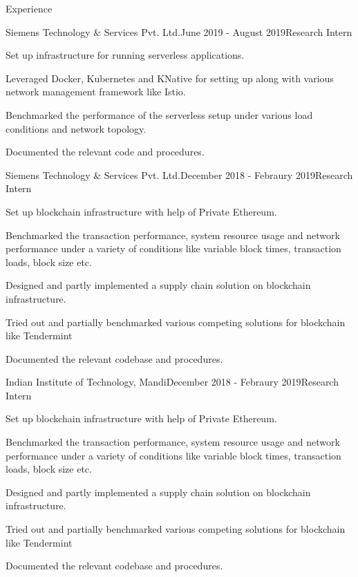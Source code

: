 \documentclass{resume} %
\begin{document}
\begin{rSection}{Experience}

\begin{rSubsection}{Siemens Technology \& Services Pvt. Ltd.}{June 2019 - August 2019}{Research Intern}{}
\item Set up infrastructure for running serverless applications.
\item Leveraged Docker, Kubernetes and KNative for setting up along with various network management framework like Istio.
\item Benchmarked the performance of the serverless setup under various load conditions and network topology.
\item Documented the relevant code and procedures. 
\end{rSubsection}


\begin{rSubsection}{Siemens Technology \& Services Pvt. Ltd.}{December 2018 - Febraury 2019}{Research Intern}{}
\item Set up blockchain infrastructure with help of Private Ethereum.
\item Benchmarked the transaction performance, system resource usage and network performance under a variety of conditions like variable block times, transaction loads, block size etc.
\item Designed and partly implemented a supply chain solution on blockchain infrastructure.
\item Tried out and partially benchmarked various competing solutions for blockchain like Tendermint
\item Documented the relevant codebase and procedures.
\end{rSubsection}


\begin{rSubsection}{Indian Institute of Technology, Mandi}{December 2018 - Febraury 2019}{Research Intern}{}
\item Set up blockchain infrastructure with help of Private Ethereum.
\item Benchmarked the transaction performance, system resource usage and network performance under a variety of conditions like variable block times, transaction loads, block size etc.
\item Designed and partly implemented a supply chain solution on blockchain infrastructure.
\item Tried out and partially benchmarked various competing solutions for blockchain like Tendermint
\item Documented the relevant codebase and procedures.
\end{rSubsection}

\end{rSection}
\end{document}
